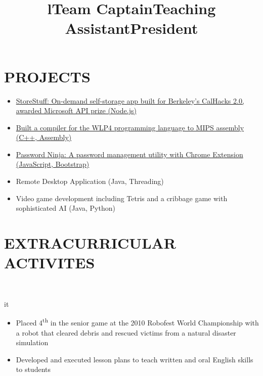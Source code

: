 \documentclass[]{res}
\begin{document}
\begin{resume}
\section{PROJECTS}
  \begin{itemize}
    \item \href{https://github.com/paulashbourne/storestuff}
      {StoreStuff: On-demand self-storage app built for Berkeley's CalHacks 2.0, awarded Microsoft API prize (Node.js)}
    \item \href{https://github.com/paulashbourne/wlp4compiler}
      {Built a compiler for the WLP4 programming language to MIPS assembly (C++, Assembly)}
    \item \href{http://password-ninja.com/}
      {Password Ninja: A password management utility with Chrome Extension (JavaScript, Bootstrap)}
    \item Remote Desktop Application (Java, Threading)
    \item Video game development including Tetris and a cribbage game with sophisticated AI (Java, Python)
  \end{itemize}

\section{EXTRACURRICULAR ACTIVITES}
  \begin{format}  \\ \title{l}{it} \\ \body \end{format}
  \title{Team Captain}
  \begin{position}
    \begin{itemize}
      \item Placed 4\textsuperscript{th} in the senior game at the 2010 Robofest World Championship with a robot that
        cleared debris and rescued victims from a natural disaster simulation
    \end{itemize}
  \end{position}
  \title{Teaching Assistant}
  \begin{position}
    \begin{itemize}
      \item Developed and executed lesson plans to teach written and oral English skills to students
    \end{itemize}
  \end{position}
  \title{President}
  \begin{position}
  \end{position}


\end{resume}
\end{document}

